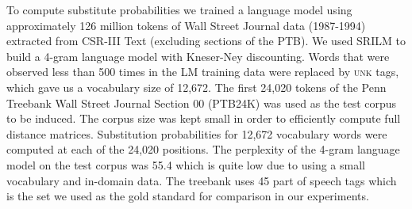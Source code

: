 
To compute substitute probabilities we trained a language model using
approximately 126 million tokens of Wall Street Journal data
(1987-1994) extracted from CSR-III Text \cite{csr3text} (excluding
sections of the PTB).
We used SRILM \cite{Stolcke2002} to build a 4-gram language model with
Kneser-Ney discounting.
Words that were observed less than 500 times in the LM training data
were replaced by \textsc{unk} tags, which gave us a vocabulary size of
12,672.
The first 24,020 tokens of the Penn Treebank Wall Street Journal
Section 00 (PTB24K) was used as the test corpus to be induced.  The corpus
size was kept small in order to efficiently compute full distance
matrices.  Substitution probabilities for 12,672 vocabulary words were
computed at each of the 24,020 positions.
The perplexity of the 4-gram language model on the test corpus was
55.4 which is quite low due to using a small 
vocabulary and in-domain data.
The treebank uses 45 part of speech tags which is the set we used as
the gold standard for comparison in our experiments.
